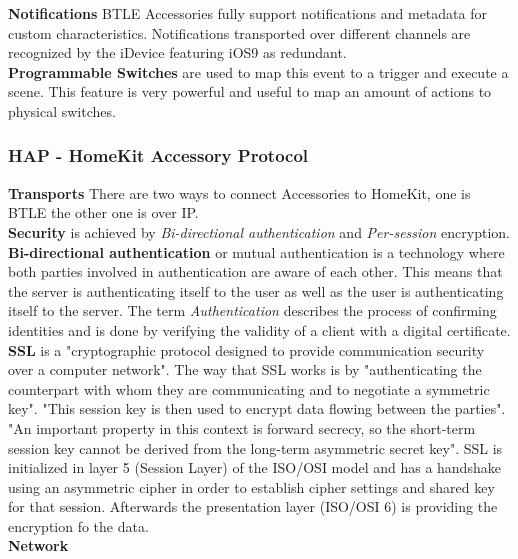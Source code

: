 			\textbf{Notifications} BTLE Accessories fully support notifications and metadata for custom characteristics. Notifications transported over different channels are recognized by the iDevice featuring iOS9 as redundant.\\

			\textbf{Programmable Switches} are used to map this event to a trigger and execute a scene. This feature is very powerful and useful to map an amount of actions to physical switches.\\

		\subsubsection{HAP - HomeKit Accessory Protocol}

			\textbf{Transports} There are two ways to connect Accessories to HomeKit, one is BTLE the other one is over IP.\\

			\textbf{Security} is achieved by \textit{Bi-directional authentication} and \textit{Per-session} encryption.\\ 

			\textbf{Bi-directional authentication} or mutual authentication is a technology where both parties involved in authentication are aware of each other. This means that the server is authenticating itself to the user as well as the user is authenticating itself to the server. The term \textit{Authentication} describes the process of confirming identities and is done by verifying the validity of a client with a digital certificate.\\

			\textbf{SSL} is a "cryptographic protocol designed to provide communication security over a computer network". The way that SSL works is by "authenticating the counterpart with whom they are communicating and to negotiate a symmetric key". "This session key is then used to encrypt data flowing between the parties". "An important property in this context is forward secrecy, so the short-term session key cannot be derived from the long-term asymmetric secret key". SSL is initialized in layer 5 (Session Layer) of the ISO/OSI model and has a handshake using an asymmetric cipher in order to establish cipher settings and shared key for that session. Afterwards the presentation layer (ISO/OSI 6) is providing the encryption fo the data.\\

			\textbf{Network}\\ 

